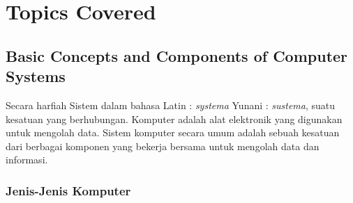 \documentclass[12pt]{article}
\begin{document}
\section{Topics Covered}

\subsection{Basic Concepts and Components of Computer Systems}
 \hspace{0.61cm}Secara harfiah Sistem dalam bahasa Latin : \textit{systema} Yunani : \textit{sustema}, suatu kesatuan yang berhubungan. Komputer adalah alat elektronik yang digunakan untuk mengolah data. Sistem komputer secara umum adalah sebuah kesatuan dari berbagai komponen yang bekerja bersama untuk mengolah data dan informasi. 

\subsubsection{ Jenis-Jenis Komputer } 
\end{document}
